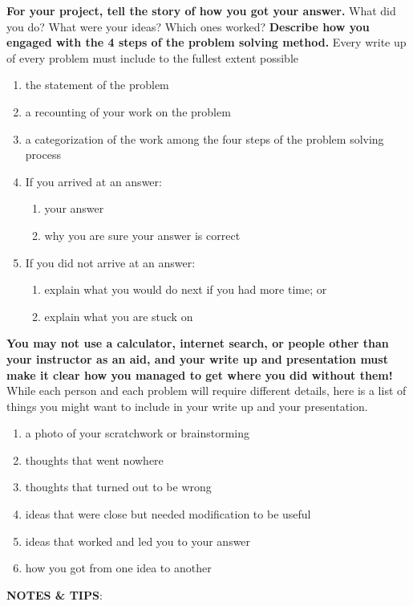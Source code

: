 \textbf{For your project, tell the story of how you got your answer.} What did you do? What were your ideas? Which ones worked? \textbf{Describe how you engaged with the 4 steps of the problem solving method.} Every write up of every problem must include to the fullest extent possible
\begin{enumerate}
	\item the statement of the problem
	\item a recounting of your work on the problem
	\item a categorization of the work among the four steps of the problem solving process
	\item If you arrived at an answer:
	\begin{enumerate}
		\item your answer 
		\item why you are sure your answer is correct
	\end{enumerate}
	\item If you did not arrive at an answer:
	\begin{enumerate}
		\item explain what you would do next if you had more time; or
		\item explain what you are stuck on
	\end{enumerate}
\end{enumerate}
\textbf{You may not use a calculator, internet search, or people other than your instructor as an aid, and your write up and presentation must make it clear how you managed to get where you did without them!} While each person and each problem will require different details, here is a list of things you might want to include in your write up and your presentation.
\begin{enumerate}
	\item a photo of your scratchwork or brainstorming
	\item thoughts that went nowhere
	\item thoughts that turned out to be wrong
	\item ideas that were close but needed modification to be useful
	\item ideas that worked and led you to your answer
	\item how you got from one idea to another
\end{enumerate}
\textbf{NOTES \& TIPS}:
